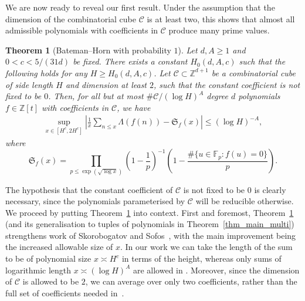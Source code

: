 \documentclass[11pt,letterpaper]{amsart}
\renewcommand{\leq}{\leqslant}
\renewcommand{\geq}{\geqslant}
\newtheorem{theorem}{Theorem}[section]
\theoremstyle{definition}
\numberwithin{equation}{section}
\newcommand{\0}{\mathbf{0}}
\begin{document}
We are now ready to reveal our first result. Under the assumption that the dimension of the combinatorial cube $\mathscr{C}$ is at least two, this shows that almost all 
admissible polynomials with coefficients in  $\mathscr{C}$ produce many prime values. 
 

\begin{theorem}[Bateman--Horn  with probability $1$]\label{thm_main}
Let $d,A\geq 1$ and $0<c<5/(31d)$ be fixed. There exists a constant $H_0(d,A,c)$ such that the following holds for any  $H\geq H_0(d,A,c)$. Let $\mathscr{C}\subset \mathbb{Z}^{d+1}$ be a combinatorial cube of side length $H$ and dimension at least $2$, such that the constant coefficient is not fixed to be $0$. Then, for all but at most $\#\mathscr{C}/(\log H)^{A}$ degree $d$ polynomials $f\in \mathbb{Z}[t]$ with coefficients in $\mathscr{C}$, we have
\begin{align}\label{eqq1}
\sup_{x\in [H^{c},2H^{c}]}\left|\frac{1}{x}\sum_{
n \leq x 
}\Lambda(f(n))-\mathfrak{S}_f(x)\right|\leq (\log H)^{-A},    
\end{align}    
where 
$$
\mathfrak{S}_{f}(x)=\prod_{p\leq \exp(\sqrt{\log x})}
\left(1-\frac{1}{p}\right)^{-1}
\left(1-
\frac{\#\{u\in \mathbb{F}_p: f(u)=0\}}{p}\right). 
$$
\end{theorem}

The hypothesis that the constant coefficient of  $\mathcal{C}$ is not fixed to be $0$ is clearly  necessary, since 
 the polynomials parameterised by $\mathcal{C}$ will  be reducible otherwise. We proceed by putting  Theorem~\ref{thm_main} into context. 
First and foremost, Theorem~\ref{thm_main} (and its 
generalisation to tuples of polynomials in
 Theorem~\ref{thm_main_multi}) strengthens  work of Skorobogatov and Sofos~\cite[Thm.~1.9]{SS}, with
 the main improvement being the increased allowable size of $x$.
 In our work we can take the length of the sum to be of polynomial size $x\asymp H^c$ in terms of the height, whereas  only sums of logarithmic length $x\asymp (\log H)^{A}$ are allowed in 
 \cite{SS}. Moreover, since the dimension of $\mathcal{C}$ is allowed to be $2$, we can average over only two coefficients, rather than the full set of coefficients needed in~\cite{SS}. 
 
\end{document}
